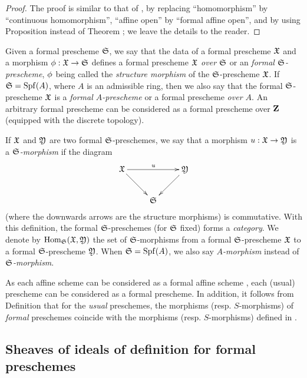 \begin{proof}
\label{proof-1.10.4.6}
The proof is similar to that of , by replacing ``homomorphism'' by ``continuous homomorphism'', ``affine open'' by ``formal affine open'', and by using Proposition  instead of Theorem ; we leave the details to the reader.
\end{proof}

\begin{env}[10.4.7]
\label{1.10.4.7}
Given a formal prescheme $\mathfrak{S}$, we say that the data of a formal prescheme $\mathfrak{X}$ and a morphism $\vphi:\fk{X}\to\fk{S}$ defines a formal prescheme \emph{$\mathfrak{X}$ over $\mathfrak{S}$} or an \emph{formal $\mathfrak{S}$-prescheme}, $\phi$ being called the \emph{structure morphism} of the $\mathfrak{S}$-prescheme $\mathfrak{X}$.
If $\mathfrak{S}={\mathop{\mathrm{Spf}}\nolimits}(A)$, where $A$ is an admissible ring, then we also say that the formal $\mathfrak{S}$-prescheme $\mathfrak{X}$ is a \emph{formal $A$-prescheme} or a formal prescheme \emph{over $A$}.
An arbitrary formal prescheme can be considered as a formal prescheme over $\mathbf{Z}$ (equipped with the discrete topology).

If $\mathfrak{X}$ and $\mathfrak{Y}$ are two formal $\mathfrak{S}$-preschemes, we say that a morphism $u:\fk{X}\to\fk{Y}$ is a \emph{$\mathfrak{S}$-morphism} if the diagram
\[
  \xymatrix{
    \fk{X}\ar[rr]^u\ar[rd] & &
    \fk{Y}\ar[ld]\\
    & \fk{S}
  }
\]
(where the downwards arrows are the structure morphisms) is commutative.
With this definition, the formal $\mathfrak{S}$-preschemes (for $\mathfrak{S}$ fixed) forms a \emph{category}.
We denote by ${\mathop{\mathrm{Hom}}\nolimits}_\mathfrak{S}(\mathfrak{X},\mathfrak{Y})$ the set of $\mathfrak{S}$-morphisms from a formal $\mathfrak{S}$-prescheme $\mathfrak{X}$ to a formal $\mathfrak{S}$-prescheme $\mathfrak{Y}$.
When $\mathfrak{S}={\mathop{\mathrm{Spf}}\nolimits}(A)$, we also say \emph{$A$-morphism} instead of \emph{$\mathfrak{S}$-morphism}.
\end{env}

\begin{env}[10.4.8]
\label{1.10.4.8}
As each affine scheme can be considered as a formal affine scheme , each (usual) prescheme can be considered as a formal prescheme.
In addition, it follows from Definition  that for the \emph{usual} preschemes, the morphisms (resp. $S$-morphisms) of \emph{formal} preschemes coincide with the morphisms (resp. $S$-morphisms) defined in .
\end{env}

\subsection{Sheaves of ideals of definition for formal preschemes}
\label{subsection-sheaves-of-ideals-of-definition-formal-preschemes}

